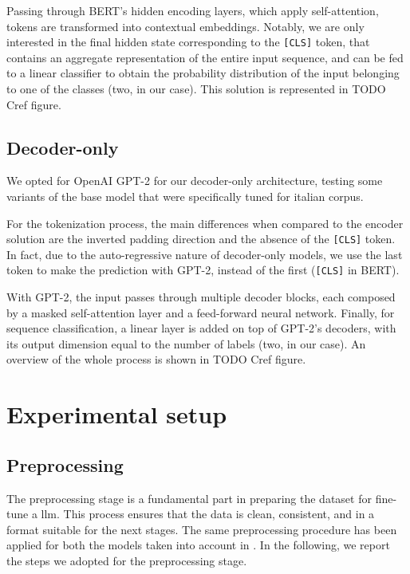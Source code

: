 \documentclass[11pt]{article}
\newcommand{\meta}[1]{{\color{blue}#1}}
\begin{document}
Passing through BERT's hidden encoding layers, which apply self-attention, tokens are transformed into
contextual embeddings. Notably, we are only interested in the final hidden state corresponding to the
\texttt{[CLS]} token, that contains an aggregate representation of the entire input sequence, and can be
fed to a linear classifier to obtain the probability distribution of the input belonging to one of the
classes (two, in our case). This solution is represented in \meta{TODO Cref figure}.

\subsection{Decoder-only}
We opted for OpenAI GPT-2 \cite{radford2019language} for our decoder-only architecture, testing some variants of the base
model that were specifically tuned for italian corpus.

For the tokenization process, the main differences when compared to the encoder solution are the inverted
padding direction and the absence of the \texttt{[CLS]} token. In fact, due to the auto-regressive nature
of decoder-only models, we use the last token to make the prediction with GPT-2, instead of the first
(\texttt{[CLS]} in BERT).

With GPT-2, the input passes through multiple decoder blocks, each composed by a masked self-attention layer
and a feed-forward neural network. Finally, for sequence classification, a linear layer is added on top of
GPT-2's decoders, with its output dimension equal to the number of labels (two, in our case). An overview
of the whole process is shown in \meta{TODO Cref figure}.

\section{Experimental setup}\label{sec:experimental-setup}

\subsection{Preprocessing}\label{sec:preprocessing}
The preprocessing stage is a fundamental part in preparing the dataset for fine-tune a \ac{llm}.
%
This process ensures that the data is clean, consistent, and in a format suitable for the next stages.
%
The same preprocessing procedure has been applied for both the models taken into account in .
%
In the following,
we report the steps we adopted for the preprocessing stage.
\end{document}
